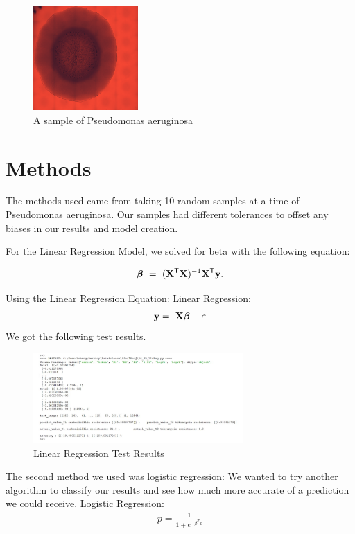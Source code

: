 \documentclass[conference]{IEEEtran}
\def \X{\boldsymbol{\rm X}}
\def \y{\boldsymbol{\rm y}}
\def \bbeta{\boldsymbol{\beta}}
\def \T{\mathsf{T}}
\def \ep{\varepsilon}
\begin{document}
\begin{figure}[h]
\centering
\includegraphics[width=4cm]{ResizedPIL-2_3dayLBCR-1.png}
\caption{A sample of Pseudomonas aeruginosa }
\label{FigResizedImage1}
\end{figure}



\section{Methods}
The methods used came from taking 10 random samples at a time  of Pseudomonas aeruginosa. Our samples had different tolerances to offset any biases in our results and model creation.


For the Linear Regression Model, we solved for beta with the following equation:

\begin{align}
\label{BetaEquation}
\bbeta \ = \ (\X^\T\X)^{-1}\X^\T\y.
\end{align}


Using the Linear Regression Equation:
\newline
\newline
    Linear Regression:
\begin{align}
\label{LinRegEq}
\y =\ \X\bbeta+\ep
\end{align}
\newline
 We got the following test results. 
\begin{figure}[h]
\centering
\includegraphics[width=8cm]{LinearReg_Result1}
\caption{Linear Regression Test Results}
\label{LinRegTestResult}
\end{figure}

The second method we used was logistic regression: We wanted to try another algorithm to classify our results and see how much more accurate of a prediction we could receive.
Logistic Regression:
\begin{align}
\label{LogRegEq}
p = \frac{1}{1+e^{-\beta^{T}x}}
\end{align}
\newline
\end{document}
